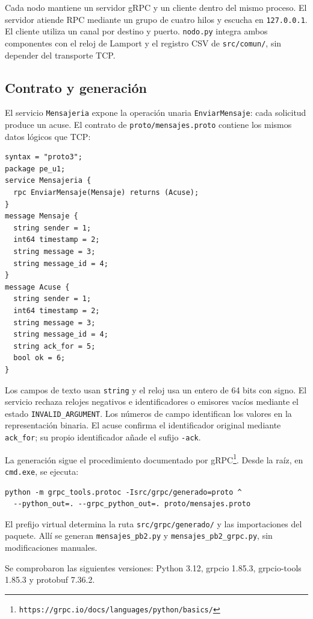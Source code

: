 \documentclass[11pt,a4paper]{article}
\begin{document}
Cada nodo mantiene un servidor gRPC y un cliente dentro del mismo proceso.
El servidor atiende RPC mediante un grupo de cuatro hilos y escucha en
\texttt{127.0.0.1}. El cliente utiliza un canal por destino y puerto.
\texttt{nodo.py} integra ambos componentes con el reloj de Lamport y el
registro CSV de \texttt{src/comun/}, sin depender del transporte TCP.

\subsection{Contrato y generación}

El servicio \texttt{Mensajeria} expone la operación unaria
\texttt{EnviarMensaje}: cada solicitud produce un acuse. El contrato
de \texttt{proto/mensajes.proto} contiene los mismos datos lógicos que TCP:

\begin{verbatim}
syntax = "proto3";
package pe_u1;
service Mensajeria {
  rpc EnviarMensaje(Mensaje) returns (Acuse);
}
message Mensaje {
  string sender = 1;
  int64 timestamp = 2;
  string message = 3;
  string message_id = 4;
}
message Acuse {
  string sender = 1;
  int64 timestamp = 2;
  string message = 3;
  string message_id = 4;
  string ack_for = 5;
  bool ok = 6;
}
\end{verbatim}

Los campos de texto usan \texttt{string} y el reloj usa un entero de
64 bits con signo. El servicio rechaza relojes negativos e identificadores
o emisores vacíos mediante el estado \texttt{INVALID\_ARGUMENT}. Los números
de campo identifican los valores en la representación binaria. El acuse
confirma el identificador original mediante \texttt{ack\_for}; su propio
identificador añade el sufijo \texttt{-ack}.

La generación sigue el procedimiento documentado por
gRPC\footnote{\texttt{https://grpc.io/docs/languages/python/basics/}}.
Desde la raíz, en \texttt{cmd.exe}, se ejecuta:

\begin{verbatim}
python -m grpc_tools.protoc -Isrc/grpc/generado=proto ^
  --python_out=. --grpc_python_out=. proto/mensajes.proto
\end{verbatim}

El prefijo virtual determina la ruta \texttt{src/grpc/generado/} y las
importaciones del paquete. Allí se generan \texttt{mensajes\_pb2.py}
y \texttt{mensajes\_pb2\_grpc.py}, sin modificaciones manuales.

Se comprobaron las siguientes versiones: Python 3.12, grpcio 1.85.3,
grpcio-tools 1.85.3 y protobuf 7.36.2.
\end{document}
